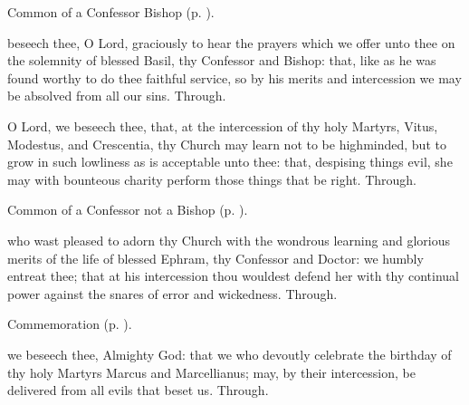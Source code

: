 
\begin{rubric}
	Common of a Confessor Bishop (p. \pageref{CommonConfessorBishop}).
\end{rubric}

{} beseech thee, O Lord, graciously to hear the prayers which we offer unto thee on the solemnity of blessed Basil, thy Confessor and Bishop: that, like as he was found worthy to do thee faithful service, so by his merits and intercession we may be absolved from all our sins. Through.


\clearpage
{}

\memorialCollect
{} O Lord, we beseech thee, that, at the intercession of thy holy Martyrs, Vitus, Modestus, and Crescentia, thy Church may learn not to be highminded, but to grow in such lowliness as is acceptable unto thee: that, despising things evil, she may with bounteous charity perform those things that be right. Through.



\begin{rubric}
	Common of a Confessor not a Bishop (p. \pageref{CommonConfessorNotBishop}).
\end{rubric}

{} who wast pleased to adorn thy Church with the wondrous learning and glorious merits of the life of blessed Ephram, thy Confessor and Doctor: we humbly entreat thee; that at his intercession thou wouldest defend her with thy continual power against the snares of error and wickedness. Through.

\begin{rubric}
	Commemoration  (p. \pageref{MarcusMarcellianusCollect}).
\end{rubric}



\memorialCollect\label{MarcusMarcellianusCollect}
 we beseech thee, Almighty God: that we who devoutly celebrate the birthday of thy holy Martyrs Marcus and Marcellianus; may, by their intercession, be delivered from all evils that beset us. Through.


